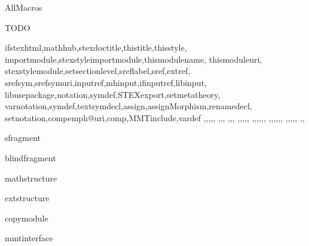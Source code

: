 \documentclass{stex}
\begin{document}
  \begin{smodule}{AllMacros}

  \begin{sfragment}{TODO}

    \begin{sfunction}{
      ifstexhtml,mathhub,stexdoctitle,thistitle,thisstyle,
      importmodule,stexstyleimportmodule,thismodulename,
      thismoduleuri,
      stexstylemodule,setsectionlevel,sreflabel,sref,extref,
      srefsym,srefsymuri,inputref,mhinput,ifinputref,libinput,
      libusepackage,notation,symdef,STEXexport,setmetatheory,
      varnotation,symdef,textsymdecl,assign,assignMorphism,renamedecl,
      setnotation,compemph@uri,comp,MMTinclude,vardef
    }{\ifstexhtml,\mathhub,\stexdoctitle,\thistitle,\thisstyle,
    \importmodule,\stexstyleimportmodule,\thismodulename,
    \thismoduleuri,\symdef,\textsymdecl,
    \stexstylemodule,\setsectionlevel,\sreflabel,\sref,\extref,
    \srefsym,\srefsymuri,,\mhinput,\ifinputref,\libinput,
    \libusepackage,\notation,\varnotation,\symdef,\STEXexport,\setmetatheory,
    \assign,\assignMorphism,\renamedecl,\setnotation,\compemph@uri,
    \comp,\MMTinclude,\vardef
    }
    \end{sfunction}

    \begin{senv}{sfragment}\end{senv}
    \begin{senv}{blindfragment}\end{senv}
    \begin{senv}{mathstructure}\end{senv}
    \begin{senv}{extstructure}\end{senv}
    \begin{senv}{copymodule}\end{senv}
    \begin{senv}{mmtinterface}\end{senv}

  \end{sfragment}
  \end{smodule}
\end{document}
